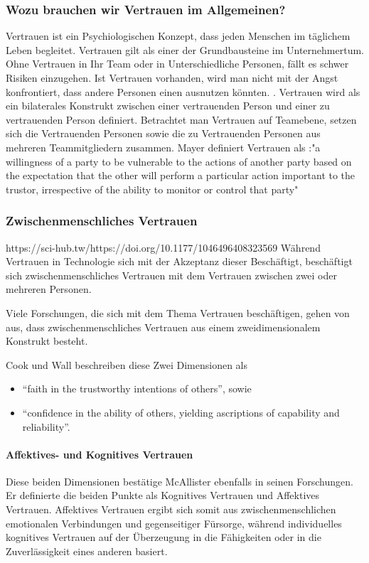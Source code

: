 \documentclass[a4paper,11pt]{article}%
\renewcommand{\\}{\vspace*{0.5\baselineskip} \newline}
\begin{document}
		\subsubsection{Wozu brauchen wir Vertrauen im Allgemeinen?}
		Vertrauen ist ein Psychiologischen Konzept, dass jeden Menschen im täglichem Leben begleitet.
Vertrauen gilt als einer der Grundbausteine im Unternehmertum. Ohne Vertrauen in Ihr Team oder in Unterschiedliche Personen, fällt es schwer Risiken einzugehen. Ist Vertrauen vorhanden, wird man nicht mit der Angst konfrontiert, dass andere Personen einen ausnutzen könnten. \citep[p.1152]{breuer2016does}.
Vertrauen wird als ein bilaterales Konstrukt zwischen einer vertrauenden Person und einer zu vertrauenden Person definiert.
\citep[p.728-729]{mayer1995integrative}
Betrachtet man Vertrauen auf Teamebene, setzen sich die Vertrauenden Personen sowie die zu Vertrauenden Personen aus mehreren Teammitgliedern zusammen.
 Mayer definiert Vertrauen als :"a willingness of a party to be vulnerable to the actions of another party based on the expectation that the other will perform a particular action important to the trustor, irrespective of the ability to monitor or control that party" \citep[p.712]{mayer1995integrative} \\

		\subsubsection{Zwischenmenschliches Vertrauen}
		https://sci-hub.tw/https://doi.org/10.1177/1046496408323569
Während Vertrauen in Technologie sich mit der Akzeptanz dieser Beschäftigt, beschäftigt sich zwischenmenschliches Vertrauen mit dem Vertrauen zwischen zwei oder mehreren Personen. \citep{mcknight2011trust}

Viele Forschungen, die sich mit dem Thema Vertrauen beschäftigen, gehen von aus, dass zwischenmenschliches Vertrauen aus einem zweidimensionalem Konstrukt besteht. \citep{johnson2005cognitive} \citep{cook1980new}

Cook und Wall beschreiben diese Zwei Dimensionen als  \begin{itemize}
\item{ “faith in the trustworthy intentions of others”, sowie}
\item{“confidence in the ability of others, yielding ascriptions of capability and reliability”.}
\end{itemize}

\paragraph{Affektives- und Kognitives Vertrauen}
Diese beiden Dimensionen bestätige McAllister ebenfalls in seinen Forschungen. Er definierte die beiden Punkte als Kognitives Vertrauen und Affektives Vertrauen.
Affektives Vertrauen ergibt sich somit aus zwischenmenschlichen emotionalen Verbindungen und gegenseitiger Fürsorge, während individuelles kognitives Vertrauen auf der Überzeugung in die Fähigkeiten oder in die Zuverlässigkeit eines anderen basiert. \citep{mcallister1995affect} \\
\end{document}
